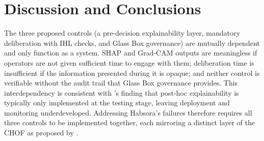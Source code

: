 \section{Discussion and Conclusions}
\label{sec:discussion}
The three proposed controls (a pre-decision explainability layer, mandatory deliberation with IHL checks, and Glass Box governance) are mutually dependent and only function as a system. SHAP and Grad-CAM outputs are meaningless if operators are not given sufficient time to engage with them; deliberation time is insufficient if the information presented during it is opaque; and neither control is verifiable without the audit trail that Glass Box governance provides. This interdependency is consistent with \citet{morley2020what}'s finding that post-hoc explainability is typically only implemented at the testing stage, leaving deployment and monitoring underdeveloped. Addressing Habsora's failures therefore requires all three controls to be implemented together, each mirroring a distinct layer of the CHOF as proposed by \citet{info12090385}.
